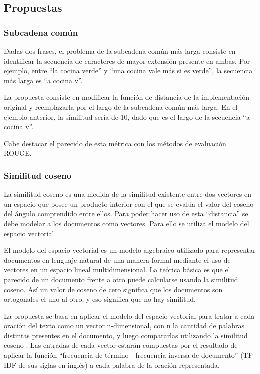 \documentclass[a4paper]{article}
\begin{document}
\subsection{Propuestas}

\subsubsection{Subcadena común}
Dadas dos frases, el problema de la subcadena común más larga consiste en identificar la secuencia de caracteres de mayor extensión presente en ambas. Por ejemplo, entre “la cocina verde” y “una cocina vale más si es verde”, la secuencia más larga es “a cocina v”.

La propuesta consiste en modificar la función de distancia de la implementación original y reemplazarla por el largo de la subcadena común más larga. En el ejemplo anterior, la similitud sería de 10, dado que es el largo de la secuencia “a cocina v”.

Cabe destacar el parecido de esta métrica con los métodos de evaluación ROUGE.


\subsubsection{Similitud coseno}
La similitud coseno es una medida de la similitud existente entre dos vectores en un espacio que posee un producto interior con el que se evalúa el valor del coseno del ángulo comprendido entre ellos. Para poder hacer uso de esta “distancia” se debe modelar a los documentos como vectores. Para ello se utiliza el modelo del espacio vectorial.

El modelo del espacio vectorial es un modelo algebraico utilizado para representar documentos en lenguaje natural de una manera formal mediante el uso de vectores en un espacio lineal multidimensional. La teórica básica es que el parecido de un documento frente a otro puede calcularse usando la similitud coseno. Así un valor de coseno de cero significa que los documentos son ortogonales el uno al otro, y eso significa que no hay similitud.

La propuesta se basa en aplicar el modelo del espacio vectorial para tratar a cada oración del texto como un vector n-dimensional, con n la cantidad de palabras distintas presentes en el documento, y luego compararlas utilizando la similitud coseno . Las entradas de cada vector estarán compuestas por el resultado de aplicar la función “frecuencia de término - frecuencia inversa de documento” (TF-IDF de sus siglas en inglés) a cada palabra de la oración representada.
\end{document}
